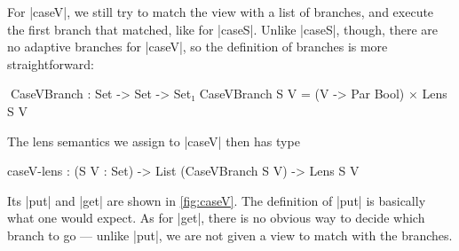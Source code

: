 \documentclass{sigplanconf}
\begin{document}
For |caseV|, we still try to match the view with a list of branches, and execute the first branch that matched, like for |caseS|.
Unlike |caseS|, though, there are no adaptive branches for |caseV|, so the definition of branches is more straightforward:
\begin{code}
^^^CaseVBranch : Set -> Set -> Set₁
CaseVBranch S V = (V -> Par Bool) × Lens S V
\end{code}
The lens semantics we assign to |caseV| then has type
\begin{code}
caseV-lens : (S V : Set) -> List (CaseVBranch S V) -> Lens S V
\end{code}
Its |put| and |get| are shown in \autoref{fig:caseV}.
The definition of |put| is basically what one would expect.
As for |get|, there is no obvious way to decide which branch to go --- unlike |put|, we are not given a view to match with the branches.
\end{document}

